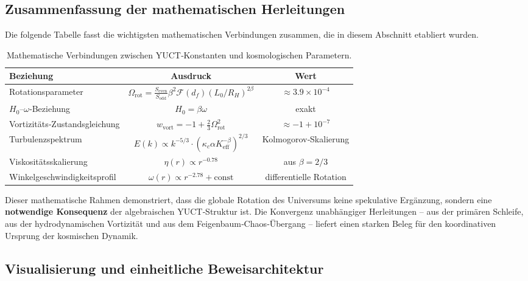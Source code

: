 \documentclass[11pt,a4paper]{article}
\begin{document}
	\subsection{Zusammenfassung der mathematischen Herleitungen}
	
	Die folgende Tabelle fasst die wichtigsten mathematischen Verbindungen zusammen, die in diesem Abschnitt etabliert wurden.
	
	\begin{table}[htbp]
		\centering
		\caption{Mathematische Verbindungen zwischen YUCT‑Konstanten und kosmologischen Parametern.}
		\label{tab:math-connections}
		\begin{tabular}{l c c}
			\toprule
			\textbf{Beziehung} & \textbf{Ausdruck} & \textbf{Wert} \\
			\midrule
			Rotationsparameter & \(\Omega_{\mathrm{rot}} = \frac{S_{\mathrm{even}}}{S_{\mathrm{odd}}} \beta^2 \mathcal{F}(d_f) (L_0/R_H)^{2\beta}\) & \(\approx 3.9 \times 10^{-4}\) \\
			\(H_0\)–\(\omega\)‑Beziehung & \(H_0 = \beta \omega\) & exakt \\
			Vortizitäts‑Zustandsgleichung & \(w_{\mathrm{vort}} = -1 + \frac{2}{3}\Omega_{\mathrm{rot}}^2\) & \(\approx -1 + 10^{-7}\) \\
			Turbulenzspektrum & \(E(k) \propto k^{-5/3} \cdot (\kappa_c \alpha K_{\mathrm{eff}}^{-\beta})^{2/3}\) & Kolmogorov‑Skalierung \\
			Viskositätsskalierung & \(\eta(r) \propto r^{-0.78}\) & aus \(\beta = 2/3\) \\
			Winkelgeschwindigkeitsprofil & \(\omega(r) \propto r^{-2.78} + \text{const}\) & differentielle Rotation \\
			\bottomrule
		\end{tabular}
	\end{table}
	
	Dieser mathematische Rahmen demonstriert, dass die globale Rotation des Universums keine spekulative Ergänzung, sondern eine \textbf{notwendige Konsequenz} der algebraischen YUCT‑Struktur ist. Die Konvergenz unabhängiger Herleitungen – aus der primären Schleife, aus der hydrodynamischen Vortizität und aus dem Feigenbaum‑Chaos‑Übergang – liefert einen starken Beleg für den koordinativen Ursprung der kosmischen Dynamik.
	
	\subsection{Visualisierung und einheitliche Beweisarchitektur}
	\label{subsec:visualization}
	
\end{document}

